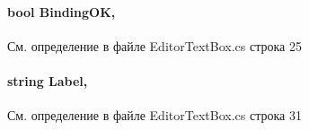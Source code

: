 \paragraph[{Binding\+O\+K}]{\setlength{\rightskip}{0pt plus 5cm}bool Binding\+O\+K\hspace{0.3cm}{\ttfamily [get]}, {}}\label{classkdz__manager_1_1_editor_text_box_a8073b9eea77b0f05bf7286d1baf7933a_a8073b9eea77b0f05bf7286d1baf7933a}


См. определение в файле Editor\+Text\+Box.\+cs строка 25

\paragraph[{Label}]{\setlength{\rightskip}{0pt plus 5cm}string Label\hspace{0.3cm}{\ttfamily [get]}, {\ttfamily [set]}}\label{classkdz__manager_1_1_editor_text_box_a0999f1070ce4923004bfb388671f0387_a0999f1070ce4923004bfb388671f0387}


См. определение в файле Editor\+Text\+Box.\+cs строка 31

